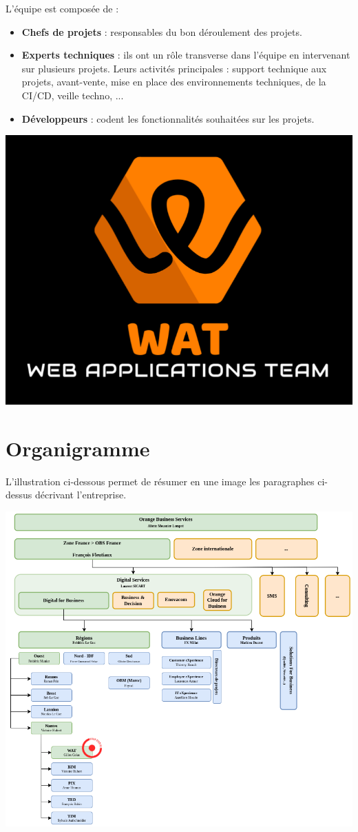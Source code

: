 	L'équipe est composée de :
	\begin{itemize}
		\item \textbf{Chefs de projets} : responsables du bon déroulement des projets.\\
		\item \textbf{Experts techniques} : ils ont un rôle transverse dans l'équipe en intervenant sur plusieurs projets. Leurs activités principales : support technique aux projets, avant-vente, mise en place des environnements techniques, de la CI/CD, veille techno, ...\\
		\item 	\textbf{Développeurs} : codent les fonctionnalités souhaitées sur les projets.\\
	\end{itemize}
	\begin{center}
		\includegraphics[scale=0.4]{chap_1/WAT-logo.png}
		\label{Equipe WAT}
	\end{center}
\section{Organigramme}
		L'illustration ci-dessous permet de résumer en une image les paragraphes ci-dessus décrivant l'entreprise.\\
		\begin{center}
			\includegraphics[scale=0.6]{chap_1/organigramme.png}
			\label{Organigramme}
		\end{center}